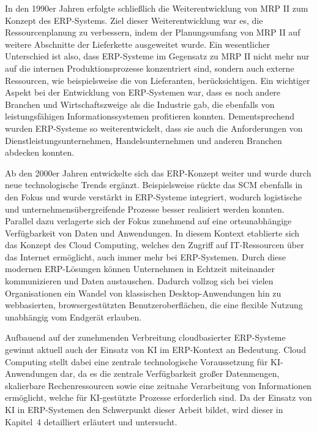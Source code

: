In den 1990er Jahren erfolgte schließlich die Weiterentwicklung von \ac{MRP II} zum Konzept des \ac{ERP}-Systems. Ziel dieser Weiterentwicklung war es, die Ressourcenplanung zu verbessern, indem der Planungsumfang von \ac{MRP II} auf weitere Abschnitte der Lieferkette ausgeweitet wurde. Ein wesentlicher Unterschied ist also, dass \ac{ERP}-Systeme im Gegensatz zu \ac{MRP II} nicht mehr nur auf die internen Produktionsprozesse konzentriert sind, sondern auch externe Ressourcen, wie beispielsweise die von Lieferanten, berücksichtigen. \cite[]{chen_planning_2001} Ein wichtiger Aspekt bei der Entwicklung von \ac{ERP}-Systemen war, dass es noch andere Branchen und Wirtschaftszweige als die Industrie gab, die ebenfalls von leistungsfähigen Informationssystemen profitieren konnten. Dementsprechend wurden \ac{ERP}-Systeme so weiterentwickelt, dass sie auch die Anforderungen von Dienstleistungsunternehmen, Handelsunternehmen und anderen Branchen abdecken konnten. \cite[]{kurbel_enterprise_2016}

Ab den 2000er Jahren entwickelte sich das \ac{ERP}-Konzept weiter und wurde durch neue technologische Trends ergänzt. Beispielsweise rückte das \ac{SCM} ebenfalls in den Fokus und wurde verstärkt in \ac{ERP}-Systeme integriert, wodurch logistische und unternehmensübergreifende Prozesse besser realisiert werden konnten. \cite[]{kurbel_enterprise_2016}
Parallel dazu verlagerte sich der Fokus zunehmend auf eine ortsunabhängige Verfügbarkeit von Daten und Anwendungen. In diesem Kontext etablierte sich das Konzept des Cloud Computing, welches den Zugriff auf IT-Ressourcen über das Internet ermöglicht, auch immer mehr bei \ac{ERP}-Systemen. Durch diese modernen \ac{ERP}-Lösungen können Unternehmen in Echtzeit miteinander kommunizieren und Daten austauschen. Dadurch vollzog sich bei vielen Organisationen ein Wandel von klassischen Desktop-Anwendungen hin zu webbasierten, browsergestützten Benutzeroberflächen, die eine flexible Nutzung unabhängig vom Endgerät erlauben. \cite[]{sarferaz_erp-software_2023}


Aufbauend auf der zunehmenden Verbreitung cloudbasierter \ac{ERP}-Systeme gewinnt aktuell auch der Einsatz von \ac{KI} im \ac{ERP}-Kontext an Bedeutung. Cloud Computing stellt dabei eine zentrale technologische Voraussetzung für \ac{KI}-Anwendungen dar, da es die zentrale Verfügbarkeit großer Datenmengen, skalierbare Rechenressourcen sowie eine zeitnahe Verarbeitung von Informationen ermöglicht, welche für \ac{KI}-gestützte Prozesse erforderlich sind. \cite[\pagef 217f]{abich_kunstliche_2022} Da der Einsatz von \ac{KI} in \ac{ERP}-Systemen den Schwerpunkt dieser Arbeit bildet, wird dieser in Kapitel~4 detailliert erläutert und untersucht.





